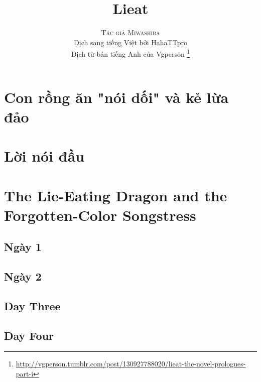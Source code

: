 \documentclass[13pt]{extarticle}
\title{\Huge \textbf{Lieat} \\ }
\author{\textsc{Tác giả Miwashiba} \\ Dịch sang tiếng Việt bởi HahaTTpro \\ Dịch từ bản tiếng Anh của Vgperson \thanks{\url{http://vgperson.tumblr.com/post/130927788020/lieat-the-novel-prologues-part-i}}}
\begin{document}
	
	\maketitle
	
	\pagebreak
		
	\tableofcontents
	
	\pagebreak
	
	\section{Con rồng ăn "nói dối" và kẻ lừa đảo}
	
	
	\section{Lời nói đầu}
	
	
	
	\section{The Lie-Eating Dragon and the Forgotten-Color Songstress}
	
	
	\subsection*{Ngày 1}
	
	
	
	\subsection*{Ngày 2}
	
	
	
	\subsection*{Day Three}
	
	
	\subsection*{Day Four}
\end{document}
